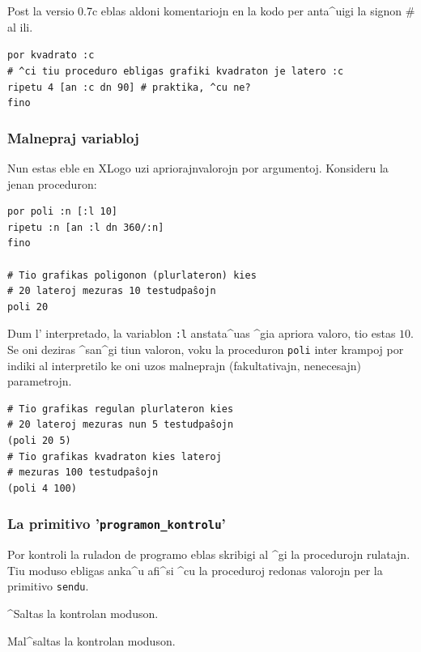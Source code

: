 Post la versio 0.7c eblas aldoni komentariojn en la kodo per anta^uigi
la signon \# al ili.

\noindent \texttt{por kvadrato :c\\
	      	\# ^ci tiu proceduro ebligas grafiki kvadraton je latero :c\\
		ripetu 4 [an :c dn 90] \# praktika, ^cu ne?\\
		fino\\
}

\subsubsection{Malnepraj variabloj}

Nun estas eble en XLogo uzi \og apriorajn\fg valorojn por argumentoj.
Konsideru la jenan proceduron:

\begin{verbatim}
por poli :n [:l 10]
ripetu :n [an :l dn 360/:n]
fino

# Tio grafikas poligonon (plurlateron) kies
# 20 lateroj mezuras 10 testudpaŝojn
poli 20 
\end{verbatim}

Dum l' interpretado, la variablon \texttt{:l} anstata^uas ^gia apriora
valoro, tio estas $10$.  Se oni deziras ^san^gi tiun valoron, voku la
proceduron \texttt{poli} inter krampoj por indiki al interpretilo ke
oni uzos malneprajn (fakultativajn, nenecesajn) parametrojn.

\begin{verbatim}
# Tio grafikas regulan plurlateron kies 
# 20 lateroj mezuras nun 5 testudpaŝojn
(poli 20 5)
# Tio grafikas kvadraton kies lateroj
# mezuras 100 testudpaŝojn
(poli 4 100)
\end{verbatim}

\subsubsection{La primitivo '\texttt{programon\_kontrolu}' }

Por kontroli la ruladon de programo eblas skribigi al ^gi la
procedurojn rulatajn.  Tiu moduso ebligas anka^u afi^si ^cu la
proceduroj redonas valorojn per la primitivo \texttt{sendu}.


^Saltas la kontrolan moduson.


Mal^saltas la kontrolan moduson.

